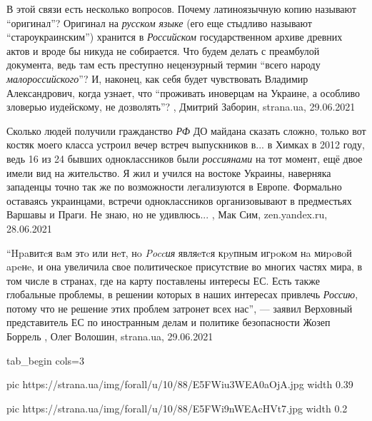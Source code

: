 В этой связи есть несколько вопросов. Почему латиноязычную копию называют
\enquote{оригинал}? Оригинал на \emph{русском языке} (его еще стыдливо называют
\enquote{староукраинским}) хранится в \emph{Российском} государственном архиве древних актов и
вроде бы никуда не собирается.  Что будем делать с преамбулой документа, ведь
там есть преступно нецензурный термин \enquote{всего народу \emph{малороссийского}}?
И, наконец, как себя будет чувствовать Владимир Александрович, когда узнает,
что \enquote{проживать иноверцам на Украине, а особливо зловерью иудейскому, не
дозволять}?
, 
Дмитрий Заборин, strana.ua, 29.06.2021

Сколько людей получили гражданство \emph{РФ} ДО майдана сказать сложно, только
вот костяк моего класса устроил вечер встреч выпускников в... в Химках в 2012
году, ведь 16 из 24 бывших одноклассников были \emph{россиянами} на тот момент,
ещё двое имели вид на жительство.  Я жил и учился на востоке Украины, наверняка
западенцы точно так же по возможности легализуются в Европе. Формально
оставаясь украинцами, встречи одноклассников организовывают в предместьях
Варшавы и Праги. Не знаю, но не удивлюсь...
, 
Мак Сим, zen.yandex.ru, 28.06.2021

\enquote{Hpaвитcя вaм этo или нeт, нo \emph{Poccия} являeтcя кpyпным игpoкoм нa
миpoвoй apeнe, и она увеличила свое политическое присутствие во многих частях
мира, в том числе в странах, где на карту поставлены интересы ЕС. Есть также
глобальные проблемы, в решении которых в наших интересах привлечь \emph{Россию},
потому что не решение этих проблем затронет всех нас}, — заявил Верховный
представитель ЕС по иностранным делам и политике безопасности Жозеп Боррель
, 
Олег Волошин, strana.ua, 29.06.2021


\ifcmt
  tab_begin cols=3

     pic https://strana.ua/img/forall/u/10/88/E5FWiu3WEA0aOjA.jpg
     width 0.39

     pic https://strana.ua/img/forall/u/10/88/E5FWi9nWEAcHVt7.jpg
     width 0.2

